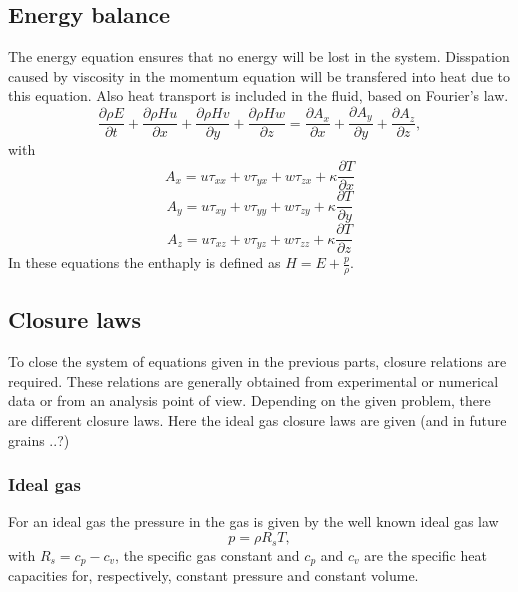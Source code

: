 \documentclass{report}
\newcommand{\dt}[1]{\frac{\partial #1}{\partial t}}
\newcommand{\dx}[1]{\frac{\partial #1}{\partial x}}
\newcommand{\dy}[1]{\frac{\partial #1}{\partial y}}
\newcommand{\dz}[1]{\frac{\partial #1}{\partial z}}
\begin{document}
\subsection{Energy balance}
The energy equation ensures that no energy will be lost in the system. Disspation caused by viscosity in the momentum equation will be transfered into heat due to this equation. Also heat transport is included in the fluid, based on Fourier's law.
\begin{equation}
\label{e:energyBalance}
\dt{\rho E} + \dx{\rho H u} + \dy{\rho H v} + \dz{\rho H w} 
= \dx{A_x}
+ \dy{A_y} 
+ \dz{A_z},
\end{equation}
with
\begin{equation}
\label{e:energyBalance_Ax}
A_x = u \tau_{xx} + v \tau_{yx} + w \tau_{zx} + \kappa\dx{T}
\end{equation}
\begin{equation}
\label{e:energyBalance_Ay}
A_y = u \tau_{xy} + v \tau_{yy} + w \tau_{zy} + \kappa\dy{T}
\end{equation}
\begin{equation}
\label{e:energyBalance_Az}
A_z = u \tau_{xz} + v \tau_{yz} + w \tau_{zz} + \kappa\dz{T}
\end{equation}
In these equations the enthaply is defined as $H = E + \frac{p}{\rho}$.

\subsection{Closure laws}
To close the system of equations given in the previous parts, closure relations are required. These relations are generally obtained from experimental or numerical data or from an analysis point of view. Depending on the given problem, there are different closure laws. Here the ideal gas closure laws are given (and in future grains ..?)
\subsubsection{Ideal gas}
For an ideal gas the pressure in the gas is given by the well known ideal gas law
\begin{equation}
\label{e:idealGasLaw}
p = \rho R_s T,
\end{equation}
with $R_s = c_p - c_v$, the specific gas constant and $c_p$ and $c_v$ are the specific heat capacities for, respectively, constant pressure and constant volume. 
\end{document}
